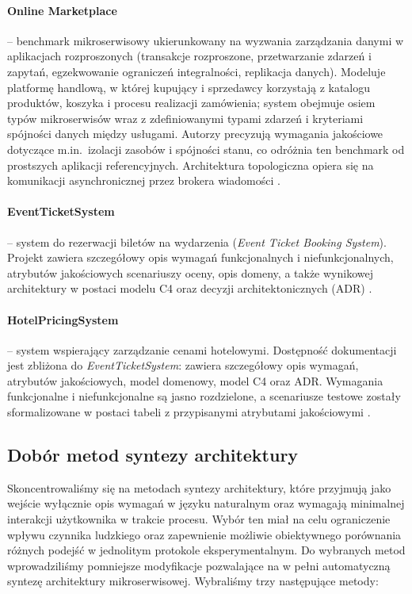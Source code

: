 \paragraph{Online Marketplace} -- benchmark mikroserwisowy ukierunkowany na wyzwania zarządzania danymi w aplikacjach rozproszonych (transakcje rozproszone, przetwarzanie zdarzeń i zapytań, egzekwowanie ograniczeń integralności, replikacja danych). Modeluje platformę handlową, w której kupujący i sprzedawcy korzystają z katalogu produktów, koszyka i procesu realizacji zamówienia; system obejmuje osiem typów mikroserwisów wraz z zdefiniowanymi typami zdarzeń i kryteriami spójności danych między usługami. Autorzy precyzują wymagania jakościowe dotyczące m.in.\ izolacji zasobów i spójności stanu, co odróżnia ten benchmark od prostszych aplikacji referencyjnych. Architektura topologiczna opiera się na komunikacji asynchronicznej przez brokera wiadomości \cite{laigner_online_marketplace_2025}.

\paragraph{EventTicketSystem} -- system do rezerwacji biletów na wydarzenia (\textit{Event Ticket Booking System}). Projekt zawiera szczegółowy opis wymagań funkcjonalnych i niefunkcjonalnych, atrybutów jakościowych scenariuszy oceny, opis domeny, a także wynikowej architektury w postaci modelu C4 oraz decyzji architektonicznych (ADR) \cite{add}.

\paragraph{HotelPricingSystem} -- system wspierający zarządzanie cenami hotelowymi. Dostępność dokumentacji jest zbliżona do \emph{EventTicketSystem}: zawiera szczegółowy opis wymagań, atrybutów jakościowych, model domenowy, model C4 oraz ADR. Wymagania funkcjonalne i niefunkcjonalne są jasno rozdzielone, a scenariusze testowe zostały sformalizowane w postaci tabeli z przypisanymi atrybutami jakościowymi \cite{add}.

\subsection{Dobór metod syntezy architektury}

Skoncentrowaliśmy się na metodach syntezy architektury, które przyjmują jako wejście wyłącznie opis wymagań w języku naturalnym oraz wymagają minimalnej interakcji użytkownika w trakcie procesu. Wybór ten miał na celu ograniczenie wpływu czynnika ludzkiego oraz zapewnienie możliwie obiektywnego porównania różnych podejść w jednolitym protokole eksperymentalnym. Do wybranych metod wprowadziliśmy pomniejsze modyfikacje pozwalające na w pełni automatyczną syntezę architektury mikroserwisowej. Wybraliśmy trzy następujące metody:

